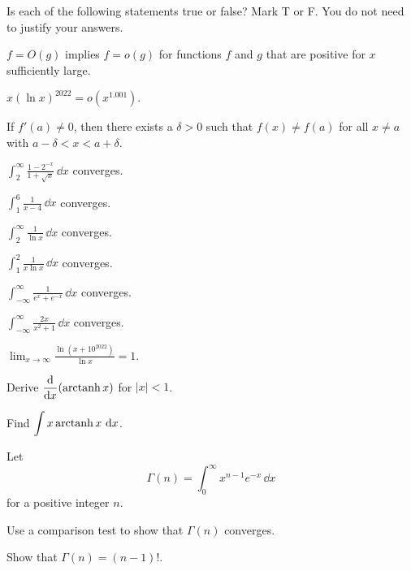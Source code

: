 \begin{problem}
Is each of the following statements true or false? Mark T or F. You do not need to justify your answers.
\begin{problemchoices}
\item $f=O(g)$ implies $f=o(g)$ for functions $f$ and $g$ that are positive for $x$ sufficiently large.
\item $x(\ln x)^{2022}=o(x^{1.001})$.
\item If $f'(a)\ne0$, then there exists a $\delta>0$ such that $f(x)\ne f(a)$ for all $x\ne a$ with $a-\delta<x<a+\delta$.
\item $\displaystyle\int_2^\infty\frac{1-2^{-x}}{1+\sqrt x}\,\dd x$ converges.
\item $\displaystyle\int_1^6\frac{1}{x-4}\,\dd x$ converges.
\item $\displaystyle\int_2^\infty\frac{1}{\ln x}\,\dd x$ converges.
\item $\displaystyle\int_1^2\frac{1}{x\ln x}\,\dd x$ converges.
\item $\displaystyle\int_{-\infty}^{\infty}\frac{1}{e^x+e^{-x}}\,\dd x$ converges.
\item $\displaystyle\int_{-\infty}^{\infty}\frac{2x}{x^2+1}\,\dd x$ converges.
\item $\displaystyle\lim_{x\to\infty}\frac{\ln(x+10^{2022})}{\ln x}=1$.
\end{problemchoices}
\end{problem}

\begin{problem}
\begin{problemsubparts}
\item Derive $\displaystyle\frac{\mathop{}\!\mathrm{d}}{\mathop{}\!\mathrm{d} x}(\operatorname{arctanh} x)$ for $|x|<1$.
\item Find $\displaystyle\int x\operatorname{arctanh} x\,\mathop{}\!\mathrm{d} x$.
\end{problemsubparts}
\end{problem}

\begin{problem}
Let
\[
\Gamma(n)=\int_0^\infty x^{n-1}e^{-x}\,\dd x
\]
for a positive integer $n$.
\begin{problemsubparts}
\item Use a comparison test to show that $\Gamma(n)$ converges.
\item Show that $\Gamma(n)=(n-1)!$.
\end{problemsubparts}
\end{problem}

